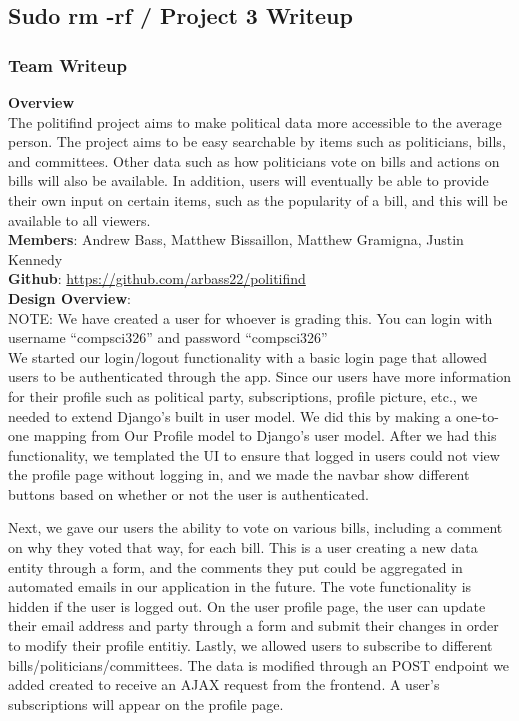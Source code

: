 \documentclass{article}
\newcommand{\n}{\noindent}
\begin{document}
\begin{center}
\subsection*{Sudo rm -rf / Project 3 Writeup}
\end{center}

\subsubsection*{Team Writeup}

\textbf{Overview} \\

The politifind project aims to make political data more accessible to the average person. The project aims to be easy searchable by items such as politicians, bills, and committees. Other data such as how politicians vote on bills and actions on bills will also be available. In addition, users will eventually be able to provide their own input on certain items, such as the popularity of a bill, and this will be available to all viewers. \\

\n\textbf{Members}: Andrew Bass, Matthew Bissaillon, Matthew Gramigna, Justin Kennedy \\

\n\textbf{Github}: \url{https://github.com/arbass22/politifind} \\

\n\textbf{Design Overview}: \\

\n NOTE: We have created a user for whoever is grading this. You can login with username ``compsci326'' and password ``compsci326'' \\

We started our login/logout functionality with a basic login page that allowed users to be authenticated through the app. Since our users have more information for their profile such as political party, subscriptions, profile picture, etc., we needed to extend Django's built in user model. We did this by making a one-to-one mapping from Our Profile model to Django's user model. After we had this functionality, we templated the UI to ensure that logged in users could not view the profile page without logging in, and we made the navbar show different buttons based on whether or not the user is authenticated.

Next, we gave our users the ability to vote on various bills, including a comment on why they voted that way, for each bill. This is a user creating a new data entity through a form, and the comments they put could be aggregated in automated emails in our application in the future.  The vote functionality is hidden if the user is logged out. On the user profile page, the user can update their email address and party through a form and submit their changes in order to modify their profile entitiy.  Lastly, we allowed users to subscribe to different bills/politicians/committees. The data is modified through an POST endpoint we added created to receive an AJAX request from the frontend.   A user's subscriptions will appear on the profile page.\\
\end{document}
